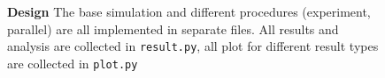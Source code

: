 \documentclass[10pt]{article}
\begin{document}

\begin{figure}[ht]
	\vspace*{-2cm}
	\caption{\textbf{Design} The base simulation and different procedures (experiment, parallel) are all implemented in separate files. All results and analysis are collected in \texttt{result.py}, all plot for different result types are collected in \texttt{plot.py}}
\label{fig:code}
\end{figure}


\clearpage
{}
\printbibliography
\end{document}
